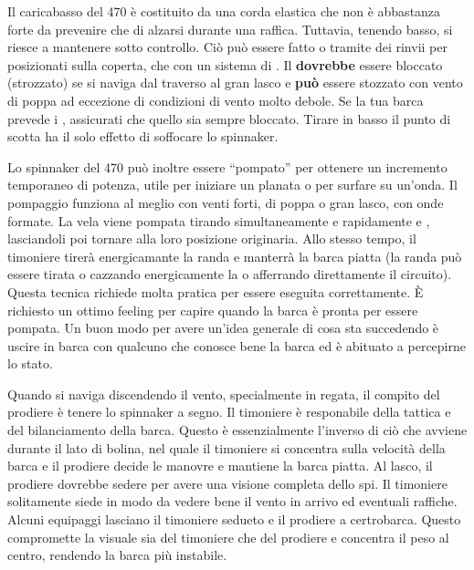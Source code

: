Il caricabasso del 470 è costituito da una corda elastica che non è abbastanza
forte da prevenire che \thepole di alzarsi durante una raffica. Tuttavia,
tenendo \theguy basso, \thepole si riesce a mantenere sotto controllo. Ciò può
essere fatto o tramite dei rinvii per \theguy posizionati sulla coperta, che con
un sistema di \twinglines. Il \guy \textbf{dovrebbe} essere bloccato (strozzato) se si
naviga dal traverso al gran lasco e \textbf{può} essere stozzato con vento di
poppa ad eccezione di condizioni di vento molto debole. Se la tua barca prevede
i \twinglines, assicurati che quello \leeward sia sempre bloccato. Tirare in
basso il punto di scotta ha il solo effetto di soffocare lo spinnaker.

Lo spinnaker del 470 può inoltre essere ``pompato'' per ottenere un incremento
temporaneo di potenza, utile per iniziare un planata o per surfare su un'onda.
Il pompaggio funziona al meglio con venti forti, di poppa o gran lasco, con onde
formate. La vela viene pompata tirando simultaneamente e rapidamente \guy e
\sheet, lasciandoli poi tornare alla loro posizione originaria. Allo stesso
tempo, il timoniere tirerà energicamante la randa e manterrà la barca piatta (la
randa può essere tirata o cazzando energicamente la \sheet o afferrando
direttamente il circuito). Questa tecnica richiede molta pratica per essere
eseguita correttamente. È richiesto un ottimo feeling per capire quando la barca
è pronta per essere pompata. Un buon modo per avere un'idea generale di cosa sta
succedendo è uscire in barca con qualcuno che conosce bene la barca ed è
abituato a percepirne lo stato.

Quando si naviga discendendo il vento, specialmente in regata, il compito del
prodiere è tenere lo spinnaker a segno. Il timoniere è responabile della tattica
e del bilanciamento della barca. Questo è essenzialmente l'inverso di ciò che
avviene durante il lato di bolina, nel quale il timoniere si concentra sulla
velocità della barca e il prodiere decide le manovre e mantiene la barca piatta.
Al lasco, il prodiere dovrebbe sedere \windward per avere una visione completa
dello spi. Il timoniere solitamente siede \leeward in modo da vedere bene il
vento in arrivo ed eventuali raffiche. Alcuni equipaggi lasciano il timoniere
sedueto \windward e il prodiere a certrobarca. Questo compromette la visuale sia
del timoniere che del prodiere e concentra il peso al centro, rendendo la barca
più instabile.

